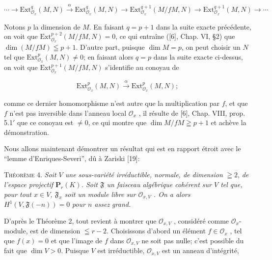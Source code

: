 \begin{equation*}
\cdots \rightarrow \mathrm{Ext}_{\mathcal{O}_x}^q(M, N) \overset{\alpha}{\longrightarrow} \mathrm{Ext}_{\mathcal{O}_x}^q(M, N) \rightarrow \mathrm{Ext}_{\mathcal{O}_x}^{q+1}(M/fM, N) \rightarrow \mathrm{Ext}_{\mathcal{O}_x}^{q+1}(M, N) \rightarrow \cdots
\end{equation*}

Notons $p$ la dimension de $M$. En faisant $q = p + 1$ dans la suite exacte précédente, on voit que $\mathrm{Ext}_{\mathcal{O}_x}^{p+2}(M/fM, N) = 0$, ce qui entraîne ([6], Chap. VI, \S2) que $\dim (M/fM) \leqq p + 1$. D'autre part, puisque $\dim M = p$, on peut choisir un $N$ tel que $\mathrm{Ext}_{\mathcal{O}_x}^p(M, N) \neq 0$; en faisant alors $q = p$ dans la suite exacte ci-dessus, on voit que $\mathrm{Ext}_{\mathcal{O}_x}^{p+1}(M/fM, N)$ s'identifie au conoyau de

\begin{equation*}
\mathrm{Ext}_{\mathcal{O}_x}^p(M, N) \overset{\alpha}{\longrightarrow} \mathrm{Ext}_{\mathcal{O}_x}^p(M, N);
\end{equation*}

comme ce dernier homomorphisme n'est autre que la multiplication par $f$, et que $f$ n'est pas inversible dans l'anneau local $\mathcal{O}_x$ , il résulte de [6], Chap. VIII, prop. 5.1$'$ que ce conoyau est $\neq 0$, ce qui montre que $\dim M/fM \geqq p + 1$ et achève la démonstration.

Nous allons maintenant démontrer un résultat qui est en rapport étroit avec le ``lemme d'Enriques-Severi'', dû à Zariski [19]:

\textsc{Théorème} 4. \textit{Soit $V$ une sous-variété irréductible, normale, de dimension} $\geqq 2$, \textit{de l'espace projectif $\mathbf{P}_r(K)$. Soit $\mathfrak{F}$ un faisceau algébrique cohérent sur $V$ tel que, pour tout $x \in V$, $\mathfrak{F}_x$ soit un module libre sur $\mathcal{O}_{x,V}$ . On a alors} $H^1(V, \mathfrak{F}(-n)) = 0$ \textit{pour $n$ assez grand.}

D'après le Théorème 2, tout revient à montrer que $\mathcal{O}_{x,V}$ , considéré comme $\mathcal{O}_x$-module, est de dimension $\leqq r - 2$. Choisissons d'abord un élément $f \in \mathcal{O}_x$ , tel que $f(x) = 0$ et que l'image de $f$ dans $\mathcal{O}_{x,V}$ ne soit pas nulle; c'est possible du fait que $\dim V > 0$. Puisque $V$ est irréductible, $\mathcal{O}_{x,V}$ est un anneau d'intégrité,

